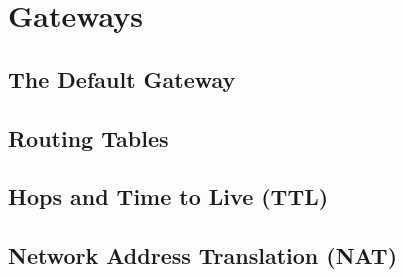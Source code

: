 \documentclass{article}
\begin{document}
\section{Gateways}

\subsection{The Default Gateway}

\subsection{Routing Tables}

\subsection{Hops and Time to Live (TTL)}

\subsection{Network Address Translation (NAT)}
\end{document}
